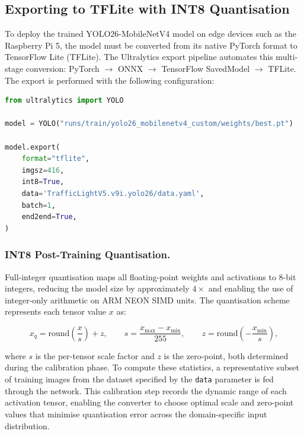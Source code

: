 \subsection{Exporting to TFLite with INT8 Quantisation}

To deploy the trained YOLO26-MobileNetV4 model on edge devices such as the Raspberry Pi 5, the model must be converted from its native PyTorch format to TensorFlow Lite (TFLite). The Ultralytics export pipeline automates this multi-stage conversion: PyTorch $\to$ ONNX $\to$ TensorFlow SavedModel $\to$ TFLite. The export is performed with the following configuration:

\begin{lstlisting}[language=Python, caption={YOLO26-MobileNetV4 TFLite export script.}, label={lst:export}]
from ultralytics import YOLO

model = YOLO("runs/train/yolo26_mobilenetv4_custom/weights/best.pt")

model.export(
    format="tflite",
    imgsz=416,
    int8=True,
    data='TrafficLightV5.v9i.yolo26/data.yaml',
    batch=1,
    end2end=True,
)
\end{lstlisting}

\subsubsection{INT8 Post-Training Quantisation.}
Full-integer quantisation maps all floating-point weights and activations to 8-bit integers, reducing the model size by approximately $4\times$ and enabling the use of integer-only arithmetic on ARM NEON SIMD units. The quantisation scheme represents each tensor value $x$ as:

\begin{equation}
\label{eq:quant}
  x_q = \text{round}\!\left(\frac{x}{s}\right) + z,
  \qquad
  s = \frac{x_{\max} - x_{\min}}{255},
  \qquad
  z = \text{round}\!\left(-\frac{x_{\min}}{s}\right),
\end{equation}

where $s$ is the per-tensor scale factor and $z$ is the zero-point, both determined during the calibration phase. To compute these statistics, a representative subset of training images from the dataset specified by the \texttt{data} parameter is fed through the network. This calibration step records the dynamic range of each activation tensor, enabling the converter to choose optimal scale and zero-point values that minimise quantisation error across the domain-specific input distribution.

